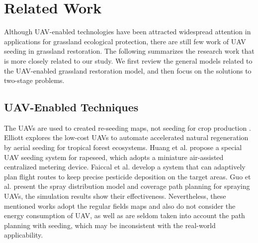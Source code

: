 \documentclass[preprint,5pt]{elsarticle}
\begin{document}
\section{Related Work} \label{Related-Work}
Although UAV-enabled technologies have been attracted widespread attention in applications for grassland ecological protection, there are still few work of UAV seeding in grassland restoration. The following summarizes the research work that is more closely related to our study. We first review the general models related to the UAV-enabled grassland restoration model, and then focus on the solutions to two-stage problems.
\subsection{UAV-Enabled Techniques}
The UAVs are used to created re-seeding maps, not seeding for crop production \cite{pedersen2017robotic}. Elliott \cite{elliott2016potential} explores the low-cost UAVs to automate accelerated natural regeneration by aerial seeding for tropical forest ecosystems. Huang et al. \cite{huang2020design} propose a special UAV seeding system for rapeseed, which adopts a miniature air-assisted centralized metering device. Faiccal et al. \cite{faiccal2017adaptive} develop a system that can adaptively plan flight routes to keep precise pesticide deposition on the target areas. Guo et al. \cite{guo2021spraying} present the spray distribution model and coverage path planning for spraying UAVs, the simulation results show their effectiveness. Nevertheless, these mentioned works adopt the regular fields maps and also do not consider the energy consumption of UAV, as well as are seldom taken into account the path planning with seeding, which may be inconsistent with the real-world applicability.
\end{document}
